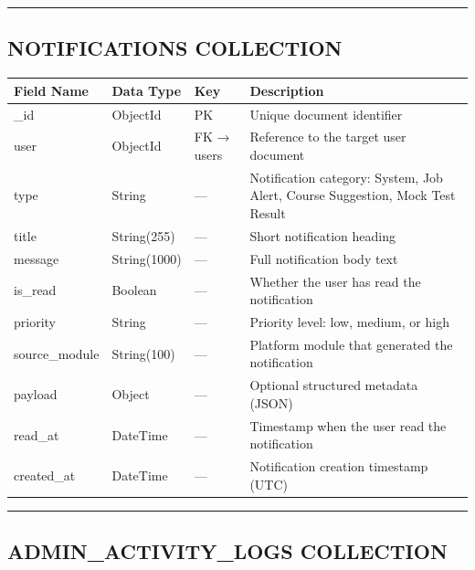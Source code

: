\documentclass[12pt]{article}
\begin{document}
\noindent\rule{\textwidth}{0.4pt}

\subsection{NOTIFICATIONS COLLECTION}


\begin{longtable}{|p{}|p{}|p{}|p{}|}
\hline
\textbf{Field Name} & \textbf{Data Type} & \textbf{Key} & \textbf{Description} \\ \hline
\endhead
\_id & ObjectId & PK & Unique document identifier \\ \hline
user & ObjectId & FK → users & Reference to the target user document \\ \hline
type & String & — & Notification category: System, Job Alert, Course Suggestion, Mock Test Result \\ \hline
title & String(255) & — & Short notification heading \\ \hline
message & String(1000) & — & Full notification body text \\ \hline
is\_read & Boolean & — & Whether the user has read the notification \\ \hline
priority & String & — & Priority level: low, medium, or high \\ \hline
source\_module & String(100) & — & Platform module that generated the notification \\ \hline
payload & Object & — & Optional structured metadata (JSON) \\ \hline
read\_at & DateTime & — & Timestamp when the user read the notification \\ \hline
created\_at & DateTime & — & Notification creation timestamp (UTC) \\ \hline
\end{longtable}


\noindent\rule{\textwidth}{0.4pt}

\subsection{ADMIN\_ACTIVITY\_LOGS COLLECTION}
\end{document}
